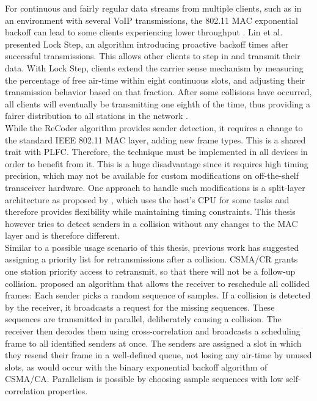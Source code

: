 For continuous and fairly regular data streams from multiple clients, such as in an environment with several VoIP transmissions, the 802.11 \gls{MAC} exponential backoff can lead to some clients experiencing lower throughput \cite{lin2009}. Lin et al. presented Lock Step, an algorithm introducing proactive backoff times after successful transmissions. This allows other clients to step in and transmit their data. With Lock Step, clients extend the carrier sense mechanism by measuring the percentage of free air-time within eight continuous slots, and adjusting their transmission behavior based on that fraction. After some collisions have occurred, all clients will eventually be transmitting one eighth of the time, thus providing a fairer distribution to all stations in the network \cite{lin2009}.\\

While the ReCoder algorithm provides sender detection, it requires a change to the standard IEEE 802.11 \gls{MAC} layer, adding new frame types. This is a shared trait with \gls{PLFC}. Therefore, the technique must be implemented in all devices in order to benefit from it. This is a huge disadvantage since it requires high timing precision, which may not be available for custom modifications on off-the-shelf transceiver hardware. One approach to handle such modifications is a split-layer architecture as proposed by \cite{nychis2009}, which uses the host's CPU for some tasks and therefore provides flexibility while maintaining timing constraints. This thesis however tries to detect senders in a collision without any changes to the \gls{MAC} layer and is therefore different.\\

Similar to a possible usage scenario of this thesis, previous work has suggested assigning a priority list for retransmissions after a collision. \gls{CSMA/CR} \cite{choi2013} grants one station priority access to retransmit, so that there will not be a follow-up collision. \cite{zhao2015} proposed an algorithm that allows the receiver to reschedule all collided frames: Each sender picks a random sequence of samples. If a collision is detected by the receiver, it broadcasts a request for the missing sequences. These sequences are transmitted in parallel, deliberately causing a collision. The receiver then decodes them using cross-correlation and broadcasts a scheduling frame to all identified senders at once. The senders are assigned a slot in which they resend their frame in a well-defined queue, not losing any air-time by unused slots, as would occur with the binary exponential backoff algorithm of \gls{CSMA/CA}. Parallelism is possible by choosing sample sequences with low self-correlation properties.


